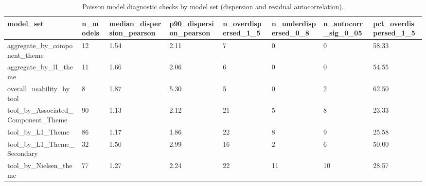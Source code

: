 \begin{table}[t]
\centering
\caption{Poisson model diagnostic checks by model set (dispersion and residual autocorrelation).}
\label{tab:poisson-diagnostics-summary}
\scriptsize
\begin{tabular}{llllllll}
\hline
model\_set & n\_models & median\_dispersion\_pearson & p90\_dispersion\_pearson & n\_overdispersed\_1\_5 & n\_underdispersed\_0\_8 & n\_autocorr\_sig\_0\_05 & pct\_overdispersed\_1\_5 \\
\hline
aggregate\_by\_component\_theme & 12 & 1.54 & 2.11 & 7 & 0 & 0 & 58.33 \\
aggregate\_by\_l1\_theme & 11 & 1.66 & 2.06 & 6 & 0 & 0 & 54.55 \\
overall\_usability\_by\_tool & 8 & 1.87 & 5.30 & 5 & 0 & 2 & 62.50 \\
tool\_by\_Associated\_Component\_Theme & 90 & 1.13 & 2.12 & 21 & 5 & 8 & 23.33 \\
tool\_by\_L1\_Theme & 86 & 1.17 & 1.86 & 22 & 8 & 9 & 25.58 \\
tool\_by\_L1\_Theme\_Secondary & 32 & 1.50 & 2.99 & 16 & 2 & 6 & 50.00 \\
tool\_by\_Nielsen\_theme & 77 & 1.27 & 2.24 & 22 & 11 & 10 & 28.57 \\
\hline
\end{tabular}
\end{table}
